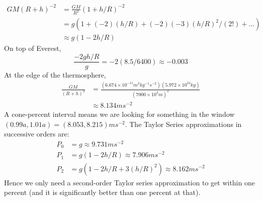 \documentclass{article}
\begin{document}
\begin{align*}
GM(R+h)^{-2} &= \frac{GM}{R^2}(1+h/R)^{-2} \\
&= g(1 + (-2)(h/R) + (-2)(-3)(h/R)^2/(2!) + ...) \\
&\approx g(1-2h/R)
\end{align*}
On top of Everest,
\begin{equation}
\frac{-2gh/R}{g} = -2(8.5/6400) \approx -0.003
\end{equation}
At the edge of the thermosphere,
\begin{align*}
\frac{GM}{(R+h)^2} &= \frac{(6.674\times10^{-11} m^3 kg^{-1} s^{-2})(5.972\times 10^{24} kg)}{(7000 \times 10^3 m)^2} \\
&\approx 8.134 m s^{-2}
\end{align*}
A cone-percent interval means we are looking for something in the window $(0.99a,1.01a)=(8.053,8.215) m s^{-2}$. The Taylor Series approximations in successive orders are:
\begin{align*}
P_0 &= g \approx 9.731 m s^{-2} \\
P_1 &= g(1-2h/R) \approx 7.906 m s^{-2} \\
P_2 &= g(1-2h/R+3(h/R)^2) \approx 8.162 m s^{-2}
\end{align*}
Hence we only need a second-order Taylor series approximation to get within one percent (and it is significantly better than one percent at that).
\end{document}
